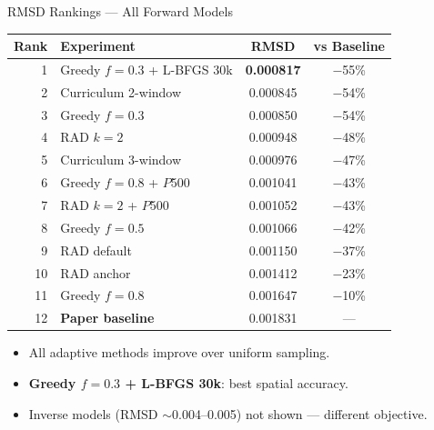 \documentclass[aspectratio=169, 11pt]{beamer}
\begin{document}
\begin{frame}{RMSD Rankings --- All Forward Models}
  \begin{center}
    \footnotesize
    \begin{tabular}{@{}rlcc@{}}
      \toprule
      \textbf{Rank} & \textbf{Experiment} & \textbf{RMSD} & \textbf{vs Baseline} \\
      \midrule
      \rowcolor{green!10}
      1  & Greedy $f\!=\!0.3$ + L-BFGS 30k & \textbf{0.000817} & $-$55\% \\
      2  & Curriculum 2-window              & 0.000845          & $-$54\% \\
      3  & Greedy $f\!=\!0.3$               & 0.000850          & $-$54\% \\
      4  & RAD $k\!=\!2$                    & 0.000948          & $-$48\% \\
      5  & Curriculum 3-window              & 0.000976          & $-$47\% \\
      6  & Greedy $f\!=\!0.8$ + $P$500      & 0.001041          & $-$43\% \\
      7  & RAD $k\!=\!2$ + $P$500           & 0.001052          & $-$43\% \\
      8  & Greedy $f\!=\!0.5$               & 0.001066          & $-$42\% \\
      9  & RAD default                      & 0.001150          & $-$37\% \\
      10 & RAD anchor                       & 0.001412          & $-$23\% \\
      11 & Greedy $f\!=\!0.8$               & 0.001647          & $-$10\% \\
      \rowcolor{red!5}
      12 & \textbf{Paper baseline}          & 0.001831          & ---     \\
      \bottomrule
    \end{tabular}
  \end{center}

  \medskip
  \begin{itemize}\small
    \item All adaptive methods improve over uniform sampling.
    \item \textbf{Greedy $f\!=\!0.3$ + L-BFGS 30k}: best spatial accuracy.
    \item Inverse models (RMSD $\sim$0.004--0.005) not shown --- different objective.
  \end{itemize}
\end{frame}
\end{document}
